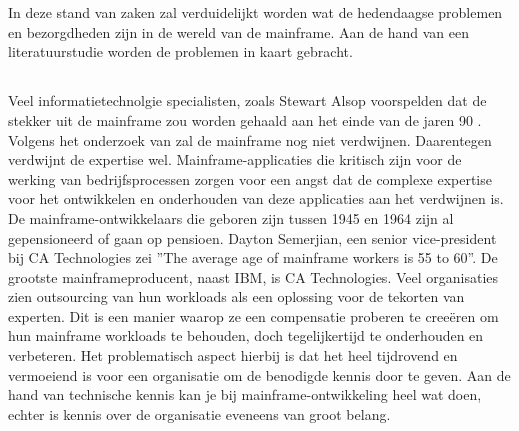 \chapter{}
\label{ch:stand-van-zaken}



In deze stand van zaken zal verduidelijkt worden wat de hedendaagse problemen en bezorgdheden zijn in de wereld van de mainframe. Aan de hand van een literatuurstudie worden de problemen in kaart gebracht. 

\section{}
\label{sec:Verdwijnen van expertise}

Veel informatietechnolgie specialisten, zoals Stewart Alsop voorspelden dat de stekker uit de mainframe zou worden gehaald aan het einde van de jaren 90 \autocite{McCracken2012}. Volgens het onderzoek van \textcite{Waites2013} zal de mainframe nog niet verdwijnen. Daarentegen verdwijnt de expertise wel. Mainframe-applicaties die kritisch zijn voor de werking van bedrijfsprocessen zorgen voor een angst dat de complexe expertise voor het ontwikkelen en onderhouden van deze applicaties aan het verdwijnen is. De mainframe-ontwikkelaars die geboren zijn tussen 1945 en 1964 zijn al gepensioneerd of gaan op pensioen. Dayton Semerjian, een senior vice-president bij CA Technologies zei ''The average age of mainframe workers is 55 to 60''. De grootste mainframeproducent, naast IBM, is CA Technologies. Veel organisaties zien outsourcing van hun workloads als een oplossing voor de tekorten van experten. Dit is een manier waarop ze een compensatie proberen te creeëren om hun mainframe workloads te behouden, doch tegelijkertijd te onderhouden en verbeteren. Het problematisch aspect hierbij is dat het heel tijdrovend en vermoeiend is voor een organisatie om de benodigde kennis door te geven. Aan de hand van technische kennis kan je bij mainframe-ontwikkeling heel wat doen, echter is kennis over de organisatie eveneens van groot belang.

